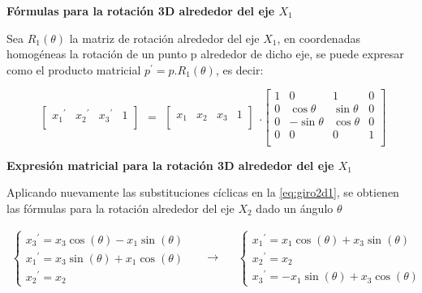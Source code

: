 \begin{center}
\textbf{\footnotesize{Fórmulas para la rotación 3D alrededor del eje $X_{1}$}}
\end{center}
    
Sea $R_{1}( \theta )$ la matriz de rotación alrededor del eje $X_{1}$, en coordenadas homogéneas la
rotación de un punto p alrededor de dicho eje, se puede expresar como el producto matricial $p^{\prime} = p.R_{1}(\theta)$, es decir:

\begin{equation}
\begin{array}{rccl}
\left[
\begin{array}{rccl}
{x_{1}}^{\prime} & {x_{2}}^{\prime} & {x_{3}}^{\prime} & 1\\
\end{array}
\right]
\end{array}
=
\begin{array}{rccl}
\left[
\begin{array}{rccl}
x_{1} & x_{2} & x_{3} & 1\\
\end{array}
\right]
\end{array} 
.
\left[
\begin{array}{rccl}
1 & 0 & 1 & 0\\
0 & \cos\theta & \sin\theta &  0\\
0 & -\sin\theta & \cos\theta & 0 \\
0 & 0 & 0 & 1\\
\end{array}
\right]
\end{equation}

\begin{center}
\textbf{\footnotesize{Expresión matricial para la rotación 3D alrededor del eje $X_{1}$}}
\end{center}

Aplicando nuevamente las substituciones cíclicas en la \ref{eq:giro2d1}, se obtienen las fórmulas para la rotación alrededor del eje $X_{2}$ dado un ángulo $\theta$

\begin{equation}
  \begin{split}
   \begin{cases}
{x_{3}}^{\prime} = x_{3} \cos(\theta) -x_{1} \sin(\theta) \\ 
{x_{1}}^{\prime} = x_{3} \sin(\theta) +x_{1} \cos(\theta) \\
{x_{2}}^{\prime} = x_{2}
\end{cases}
  \end{split}
\quad\longrightarrow\quad
  \begin{split}
   \begin{cases}
{x_{1}}^{\prime} = x_{1} \cos(\theta) + x_{3}\sin(\theta) \\ 
{x_{2}}^{\prime} = x_{2} \\
{x_{3}}^{\prime} = -x_{1} \sin(\theta) + x_{3} \cos(\theta)
\end{cases}
\end{split}
\end{equation}

